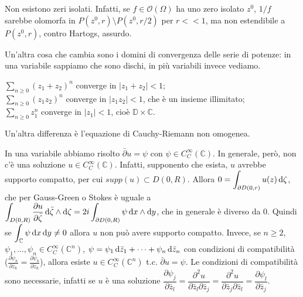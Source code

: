 \begin{ex}
  Non esistono zeri isolati. Infatti, se $f \in \mathcal{O}(\Omega)$ ha uno zero isolato $z^0$, $1/f$ sarebbe olomorfa in $P(z^0,r) \setminus P(z^0, r/2)$ per $r<<1$, ma non estendibile a $P(z^0, r)$, contro Hartogs, assurdo.
\end{ex}

Un'altra cosa che cambia sono i domini di convergenza delle serie di potenze: in una variabile sappiamo che sono dischi, in più variabili invece vediamo.

\begin{ex}
  $\displaystyle \sum_{n \ge 0} (z_1+z_2)^n$ converge in $|z_1+z_2|<1$; \\
  $\displaystyle \sum_{n \ge 0} (z_1z_2)^n$ converge in $|z_1z_2|<1$, che è un insieme illimitato; \\
  $\displaystyle \sum_{n \ge 0} z_1^n$ converge in $|z_1|<1$, cioè $\mathbb{D}\times \mathbb{C}$.
\end{ex}

Un'altra differenza è l'equazione di Cauchy-Riemann non omogenea.

\begin{ex}
  In una variabile abbiamo risolto $\bar{\partial}u=\psi$ con $\psi \in C^\infty_C(\mathbb{C})$. In generale, però, non c'è una soluzione $u \in C^\infty_C(\mathbb{C})$. Infatti, supponento che esista, $u$ avrebbe supporto compatto, per cui $supp(u) \subset D(0,R)$.
  Allora $\displaystyle 0=\int_{\partial D(0,r)} u(z)\mathop{}\!\mathrm{d} \zeta$, che per Gauss-Green o Stokes è uguale a $\displaystyle \int_{D(0,R)} \dfrac{\partial u}{\partial \bar{\zeta}} \mathop{}\!\mathrm{d}\bar{\zeta}\wedge\mathop{}\!\mathrm{d}\zeta=2i\int_{\partial D(0,R)} \psi \mathop{}\!\mathrm{d} x\wedge\mathop{}\!\mathrm{d} y$, che in generale è diverso da $0$. Quindi se $\displaystyle \int_{\mathbb{C}} \psi \mathop{}\!\mathrm{d} x \mathop{}\!\mathrm{d} y\not=0$ allora $u$ non può avere supporto compatto.
  Invece, se $n \ge 2$, $\psi_1, \dots, \psi_n \in C^\infty_C(\mathbb{C}^n)$, $\psi=\psi_1\mathop{}\!\mathrm{d} \bar{z}_1+\dots+\psi_n\mathop{}\!\mathrm{d} \bar{z}_n$ con condizioni di compatibilità ($\frac{\partial \psi_h}{\partial \bar{z}_k}=\frac{\partial \psi_k}{\partial \bar{z}_h}$), allora esiste $u \in C^\infty_C(\mathbb{C}^n)$ t.c. $\bar{\partial}u=\psi$.
  Le condizioni di compatibilità sono necessarie, infatti se $u$ è una soluzione $\dfrac{\partial \psi_j}{\partial \bar{z}_l}=\dfrac{\partial^2u}{\partial \bar{z}_l\partial \bar{z}_j}=\dfrac{\partial^2u}{\partial \bar{z}_j\partial \bar{z}_l}=\dfrac{\partial \psi_l}{\partial \bar{z}_j}$.
\end{ex}


